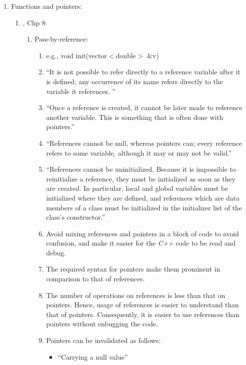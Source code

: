 \begin{enumerate}
\item Functions and pointers: \vspace{-0.3cm}
	\begin{enumerate} \itemsep -2pt
	\item \cite{Stroustrup2014}, Chp 8: \vspace{-0.2cm}
		\begin{enumerate} \itemsep -2pt
		\item Pass-by-reference: \vspace{-0.1cm}
			\begin{enumerate} \itemsep -1pt
			\item e.g., void init(vector$<$double$>$ \&v)
			\item ``It is not possible to refer directly to a reference variable after it is defined; any occurrence of its name refers directly to the variable it references. ''
			\item ``Once a reference is created, it cannot be later made to reference another variable. This is something that is often done with pointers.''
			\item ``References cannot be null, whereas pointers can; every reference refers to some variable, although it may or may not be valid.''
			\item ``References cannot be uninitialized. Because it is impossible to reinitialize a reference, they must be initialized as soon as they are created. In particular, local and global variables must be initialized where they are defined, and references which are data members of a class must be initialized in the initializer list of the class's constructor.''
			\item Avoid mixing references and pointers in a block of code to avoid confusion, and make it easier for the {\it C++} code to be read and debug.
			\item The required syntax for pointers make them prominent in comparison to that of references.
			\item The number of operations on references is less than that on pointers. Hence, usage of references is easier to understand than that of pointers. Consequently, it is easier to use references than pointers without enbugging the code.
			\item Pointers can be invalidated as follows: \vspace{-0.1cm}
				\begin{itemize} \itemsep -1pt
				\item ``Carrying a null value''

\end{itemize}
\end{enumerate}
\end{enumerate}
\end{enumerate}
\end{enumerate}
